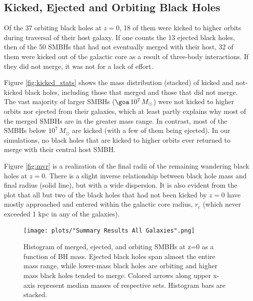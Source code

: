 \documentclass[fleqn,usenatbib,useAMS]{mnras}
\begin{document}
\subsection{Kicked, Ejected and Orbiting Black Holes}\label{sec:kicked_orbiting}
Of the 37 orbiting black holes at $z=0$, 18 of them were kicked to higher orbits during traversal of their host galaxy.  If one counts the 13 ejected black holes, then of the 50 SMBHs that had not eventually merged with their host, 32 of them were kicked out of the galactic core as a result of three-body interactions.  If they did not merge, it was not for a lack of effort.

Figure \ref{fig:kicked_stats} shows the mass distribution (stacked) of kicked and not-kicked black holes, including those that merged and those that did not merge.  The vast majority of larger SMBHs ($\goa\, 10^7\, M_{\odot}$) were not kicked to higher orbits nor ejected from their galaxies, which at least partly explains why most of the merged SMBHs are in the greater mass range.  In contrast, most of the SMBHs below $10^7\, M_{\odot}$ are kicked (with a few of them being ejected).  In our simulations, no black holes that are kicked to higher orbits ever returned to merge with their central host SMBH.

Figure \ref{fig:mvr} is a realization of the final radii of the remaining wandering black holes at $z=0$.  There is a slight inverse relationship between black hole mass and final radius (solid line), but with a wide dispersion.  It is also evident from the plot that all but two of the black holes that had not been kicked by $z=0$ have mostly approached and entered within the galactic core radius, $r_c$ (which never exceeded 1 kpc in any of the galaxies).

\begin{figure}
\begin{center}
\texttt{[image: plots/"Summary Results All Galaxies".png]}
\caption{Histogram of merged, ejected, and orbiting SMBHs at z=0 as a function of BH mass.  Ejected black holes span almost the entire mass range, while lower-mass black holes are orbiting and higher mass black holes tended to merge.  Colored arrows along upper x-axis represent median masses of respective sets.  Histogram bars are stacked.}
\label{fig:meosmbh}
\end{center}
\end{figure}
\end{document}
